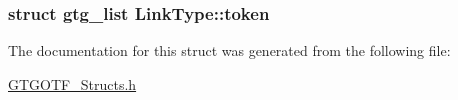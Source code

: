 \hypertarget{structLinkType_a8430d62765b8301d38b63ef8d52c14dd}{
\subsubsection[{token}]{\setlength{\rightskip}{0pt plus 5cm}struct {\bf gtg\-\_\-list} Link\-Type\-::token}}\label{structLinkType_a8430d62765b8301d38b63ef8d52c14dd}


The documentation for this struct was generated from the following file\-:\begin{DoxyCompactItemize}
\item 
\hyperlink{GTGOTF__Structs_8h}{G\-T\-G\-O\-T\-F\-\_\-\-Structs.\-h}\end{DoxyCompactItemize}
